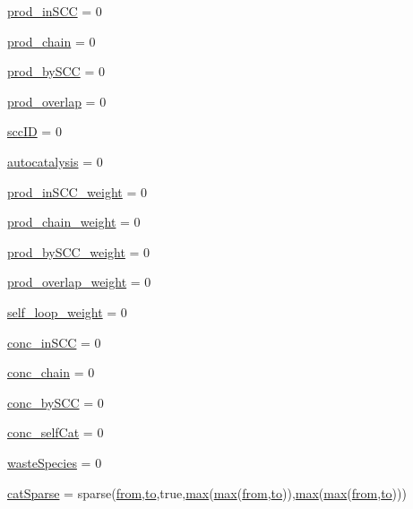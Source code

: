 \begin{DoxyCompactItemize}
\item 
\hyperlink{a00028_a4af96d327ccc28de3433ec07f61e2617}{prod\-\_\-in\-S\-C\-C} = 0
\item 
\hyperlink{a00028_ae0bd6421b7c81047a5234aeeb707efc4}{prod\-\_\-chain} = 0
\item 
\hyperlink{a00028_a9c39bd233d632a4392a969b0ba0ac2bd}{prod\-\_\-by\-S\-C\-C} = 0
\item 
\hyperlink{a00028_a0aa4c3fee8d2729e5b7aa511a3100685}{prod\-\_\-overlap} = 0
\item 
\hyperlink{a00028_a85ff953f350ff6660d5f3489e31d57b6}{scc\-I\-D} = 0
\item 
\hyperlink{a00028_a2d0b5f62c8a18e8cbfeb15c6f8856c5a}{autocatalysis} = 0
\item 
\hyperlink{a00028_aeb0c708cea53f4ecbc2e1a8fad331f3b}{prod\-\_\-in\-S\-C\-C\-\_\-weight} = 0
\item 
\hyperlink{a00028_a0924b7317732c12de281bee31879470d}{prod\-\_\-chain\-\_\-weight} = 0
\item 
\hyperlink{a00028_aac9f4f22f537f0fc5fd69163676333af}{prod\-\_\-by\-S\-C\-C\-\_\-weight} = 0
\item 
\hyperlink{a00028_a75fbcaf1e595fc3264e0cba051e4ba02}{prod\-\_\-overlap\-\_\-weight} = 0
\item 
\hyperlink{a00028_a8c1a84735122e25dcd5f68a0bf4c312b}{self\-\_\-loop\-\_\-weight} = 0
\item 
\hyperlink{a00028_a2ac2f79c8327273bba427ba3e8d2cfbe}{conc\-\_\-in\-S\-C\-C} = 0
\item 
\hyperlink{a00028_a0c333384119ea83494f4b4310ac18eea}{conc\-\_\-chain} = 0
\item 
\hyperlink{a00028_a5884b552ac8657e68e86a84f3d6c173a}{conc\-\_\-by\-S\-C\-C} = 0
\item 
\hyperlink{a00028_a2a45c56ac35d4906cc4a8363b98b1caa}{conc\-\_\-self\-Cat} = 0
\item 
\hyperlink{a00028_a4648745d0256487cb11cb5235f3b9be3}{waste\-Species} = 0
\item 
\hyperlink{a00028_af1693f05ef323ea183b39bc85226c0a8}{cat\-Sparse} = sparse(\hyperlink{a00028_aa7b4fe13e75a69fca72862effeaf6196}{from},\hyperlink{a00028_af71dbe52628a3f83a77ab494817525c6}{to},true,\hyperlink{a00104_a6d9c24e62aee61f54530163edf684ae2}{max}(\hyperlink{a00104_a6d9c24e62aee61f54530163edf684ae2}{max}(\hyperlink{a00028_aa7b4fe13e75a69fca72862effeaf6196}{from},\hyperlink{a00028_af71dbe52628a3f83a77ab494817525c6}{to})),\hyperlink{a00104_a6d9c24e62aee61f54530163edf684ae2}{max}(\hyperlink{a00104_a6d9c24e62aee61f54530163edf684ae2}{max}(\hyperlink{a00028_aa7b4fe13e75a69fca72862effeaf6196}{from},\hyperlink{a00028_af71dbe52628a3f83a77ab494817525c6}{to})))

\end{DoxyCompactItemize}

